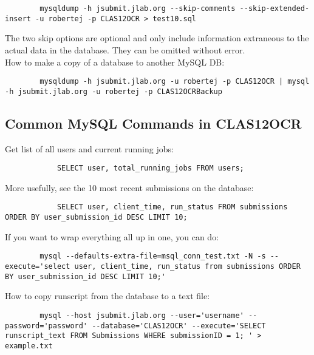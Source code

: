     \begin{lstlisting}
        mysqldump -h jsubmit.jlab.org --skip-comments --skip-extended-insert -u robertej -p CLAS12OCR > test10.sql  
    \end{lstlisting}
    
    The two skip options are optional and only include information extraneous to the actual data in the database. They can be omitted without error.\\
    
    How to make a copy of a database to another MySQL DB:

    \begin{lstlisting}
        mysqldump -h jsubmit.jlab.org -u robertej -p CLAS12OCR | mysql -h jsubmit.jlab.org -u robertej -p CLAS12OCRBackup
    \end{lstlisting}    
    
    \subsection{Common MySQL Commands in CLAS12OCR}
    
        Get list of all users and current running jobs:
        
        \begin{lstlisting}
            SELECT user, total_running_jobs FROM users;
        \end{lstlisting}
        
        More usefully, see the 10 most recent submissions on the database:
        
        \begin{lstlisting}
            SELECT user, client_time, run_status FROM submissions ORDER BY user_submission_id DESC LIMIT 10;
        \end{lstlisting}
        
        
        If you want to wrap everything all up in one, you can do: 
        \begin{lstlisting}
        mysql --defaults-extra-file=msql_conn_test.txt -N -s --execute='select user, client_time, run_status from submissions ORDER BY user_submission_id DESC LIMIT 10;' 
        \end{lstlisting}
        
        
        How to copy runscript from the database to a text file:
        \begin{lstlisting}
        mysql --host jsubmit.jlab.org --user='username' --password='password' --database='CLAS12OCR' --execute='SELECT runscript_text FROM Submissions WHERE submissionID = 1; ' > example.txt
        \end{lstlisting}


